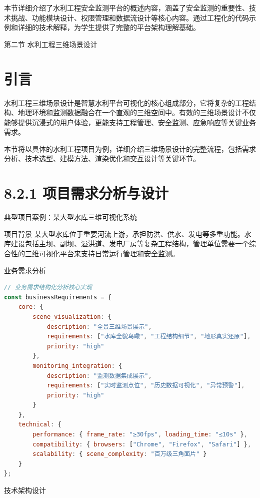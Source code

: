本节详细介绍了水利工程安全监测平台的概述内容，涵盖了安全监测的重要性、技术挑战、功能模块设计、权限管理和数据流设计等核心内容。通过工程化的代码示例和详细的技术解释，为学生提供了完整的平台架构理解基础。

 第二节 水利工程三维场景设计

\section{引言}

水利工程三维场景设计是智慧水利平台可视化的核心组成部分，它将复杂的工程结构、地理环境和监测数据融合在一个直观的三维空间中。有效的三维场景设计不仅能够提供沉浸式的用户体验，更能支持工程管理、安全监测、应急响应等关键业务需求。

本节将以具体的水利工程项目为例，详细介绍三维场景设计的完整流程，包括需求分析、技术选型、建模方法、渲染优化和交互设计等关键环节。

\section{8.2.1 项目需求分析与设计}

 典型项目案例：某大型水库三维可视化系统

 项目背景 某大型水库位于重要河流上游，承担防洪、供水、发电等多重功能。水库建设包括主坝、副坝、溢洪道、发电厂房等复杂工程结构，管理单位需要一个综合性的三维可视化平台来支持日常运行管理和安全监测。

 业务需求分析

\begin{lstlisting}[language=Javascript]
// 业务需求结构化分析核心实现
const businessRequirements = {
    core: {
        scene_visualization: {
            description: "全景三维场景展示",
            requirements: ["水库全貌鸟瞰", "工程结构细节", "地形真实还原"],
            priority: "high"
        },
        monitoring_integration: {
            description: "监测数据集成展示", 
            requirements: ["实时监测点位", "历史数据可视化", "异常预警"],
            priority: "high"
        }
    },
    technical: {
        performance: { frame_rate: "≥30fps", loading_time: "≤10s" },
        compatibility: { browsers: ["Chrome", "Firefox", "Safari"] },
        scalability: { scene_complexity: "百万级三角面片" }
    }
};
\end{lstlisting}

 技术架构设计

